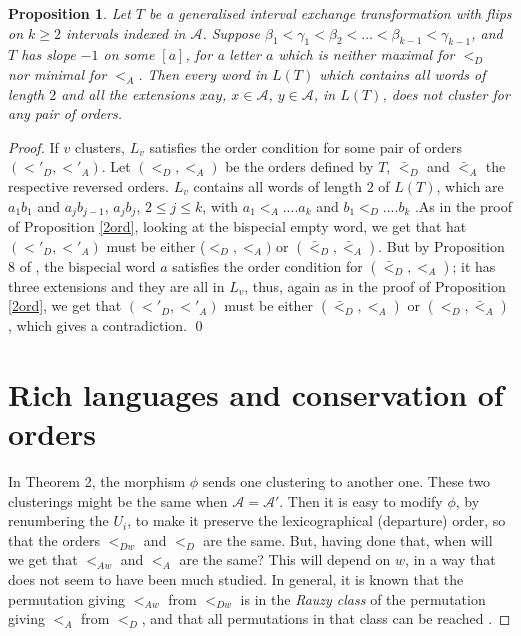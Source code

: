 \documentclass[12pt,a4paper]{amsart}
\newtheorem{proposition}[theorem]{Proposition}
\begin{document}
\begin{proposition}\label{fi} Let $T$ be a generalised interval exchange transformation  with flips  on $k\geq 2$ intervals indexed in  $\mathcal A$. Suppose $\beta_1<\gamma_1<\beta_2 <\ldots <\beta_{k-1}<\gamma_{k-1}$, and $T$ has slope $-1$ on some $[a]$, for a letter $a$ which is neither maximal for $<_D$ nor minimal for $<_A$. Then every word in $L(T)$ which contains all words of length $2$ and all the extensions $xay$, $x\in\mathcal A$, $y\in\mathcal A$, in  $L(T)$, does not cluster for any pair of orders. \end{proposition}
\begin{proof} If $v$ clusters, $L_v$ satisfies the order condition for some pair of orders $(<'_D, <'_A)$. Let $(<_D, <_A)$ be the orders defined by $T$, $\bar <_D$ and $\bar <_A$ the respective reversed orders. $L_v$  contains all words of length $2$ of $L(T)$, which are $a_1b_1$ and  $a_jb_{j-1}$, $a_jb_j$, $2\leq j\leq k$, with $a_1<_A .... a_k$ and  
$b_1<_D .... b_k$ .As in the proof of Proposition \ref{2ord}, looking at  the bispecial empty word, we get that hat $(<'_D, <'_A)$ must be either ($<_D,<_A)$ or $(\bar <_D, \bar <_A)$. 
But by Proposition 8 of \cite{fhuz}, the bispecial word $a$ satisfies the order condition for $(\bar <_D,<_A)$; it has three extensions and they are all in  $L_v$, thus, again as in the proof of Proposition \ref{2ord}, we get that $(<'_D, <'_A)$ must be either $(\bar <_D, <_A)$ or $(<_D, \bar <_A)$, which gives a contradiction. \qed \\




\section{Rich languages and conservation of orders}
In Theorem 2, the morphism $\phi$ sends one  clustering to another one.  These two clusterings might be the same  when $\mathcal A=\mathcal A'$.  Then it   is easy to modify $\phi$, by renumbering the $U_i$, to make it preserve the lexicographical (departure) order,  so that the orders $<_{Dw}$ and $<_D$ are the same. But, having done that, when will we get that  $<_{Aw}$ and $<_A$ are the same? This will depend on $w$, in a way that does not seem to have been much studied. In general, it is known that the permutation giving $<_{Aw}$ from $<_{Dw}$ is in the {\it Rauzy class} of the permutation giving $<_A$ from $<_D$, and that all permutations in that class can be reached \cite{rau}. 


\end{proof}
\end{document}
